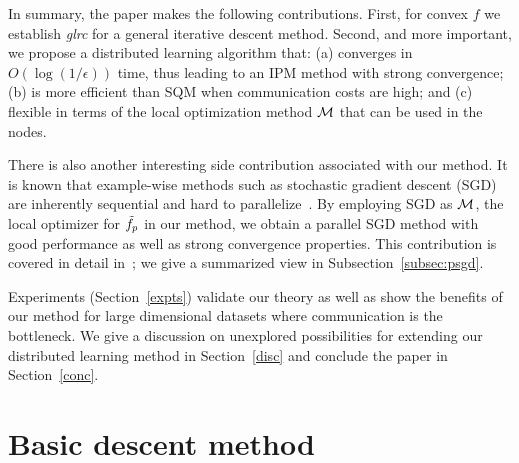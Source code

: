 \documentclass[twoside, 11pt]{article}
\begin{document}

In summary, the paper makes the following contributions.
First, for convex $f$ we establish {\it glrc} for a general iterative descent method.
Second, and more important, we propose a distributed learning algorithm that: (a) converges in $O(\log (1/\epsilon))$ time, thus leading to an IPM method with strong convergence; (b) is more efficient than SQM when communication costs are high; and (c) flexible in terms of the local optimization method ${\cal M}$ that can be used in the nodes.

There is also another interesting side contribution associated with our method. It is known that example-wise methods such as stochastic gradient descent (SGD) are inherently sequential and hard to parallelize~\citep{zinkevich2010}. By employing SGD as ${\cal M}$, the local optimizer for $\tilde{f}_p$ in our method, we obtain a parallel SGD method with good performance as well as strong convergence properties. This contribution is covered in detail in~\citet{mahajan2013}; we give a summarized view in Subsection~\ref{subsec:psgd}.

Experiments (Section~\ref{expts}) validate our theory as well as show the benefits of our method for large dimensional datasets where communication is the bottleneck. We give a discussion on unexplored possibilities for extending our distributed learning method in Section~\ref{disc} and conclude the paper in Section~\ref{conc}.





%

\section{Basic descent method}
\label{general}
\end{document}
